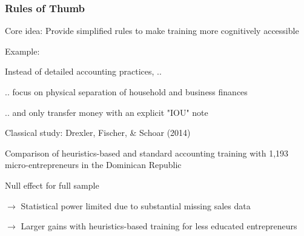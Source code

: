 \documentclass[hideothersubsections, usenames,dvipsnames,11pt]{beamer}
\newenvironment{itemize_2pt}{\itemize\addtolength{\itemsep}{2pt}}{\enditemize}
\begin{document}
\begin{frame}[label=Drexler_thumb]
\frametitle{Rules of Thumb}

Core idea: Provide \textcolor{bdf}{simplified rules} to make training more cognitively accessible

\begin{itemize_2pt}
	
	\item Example: 
	\begin{itemize_2pt}
		\item Instead of detailed accounting practices, ..
		\item[] .. focus on \textcolor{bdf}{physical separation of household and business finances} 
		\item[] .. and only transfer money with an explicit \textcolor{bdf}{"IOU" note}
	\end{itemize_2pt}
	
	\vspace{1.0em}
	
	\item Classical study: \textcolor{camel}{Drexler, Fischer, \& Schoar (2014)}
	\begin{itemize_2pt}
		\item Comparison of heuristics-based and standard accounting training with 1,193 micro-entrepreneurs in the Dominican  Republic
		\item Null effect for full sample
		\item[] $\rightarrow$ Statistical power limited due to substantial missing sales data
		\item[] $\rightarrow$ \textcolor{bdf}{Larger gains with heuristics-based training for less educated entrepreneurs}
		
	\end{itemize_2pt}
\end{itemize_2pt}
\end{frame}
\end{document}

